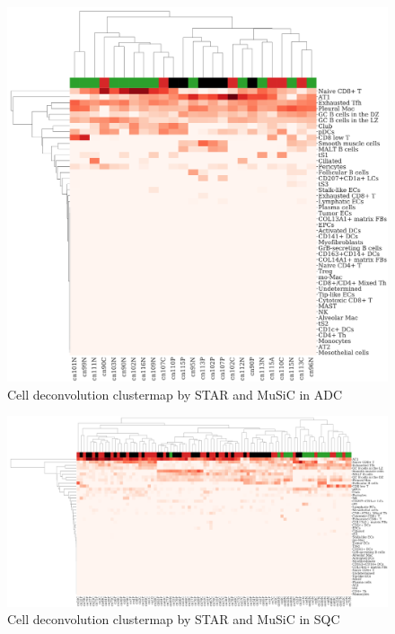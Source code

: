 \documentclass[a4paper]{article}
\begin{document}
                \begin{figure}[htbp]
                    \centering
                    \includegraphics[width=0.6 \linewidth]{figures/MuSiC/clustermap/STAR.ADC.cluster.pdf}
                    \caption{Cell deconvolution clustermap by STAR and MuSiC in ADC}
                    \label{fig:Deconvolution-MuSiC-STAR-cluster-ADC}
                \end{figure}

                \begin{figure}[htbp]
                    \centering
                    \includegraphics[width=\linewidth]{figures/MuSiC/clustermap/STAR.SQC.cluster.pdf}
                    \caption{Cell deconvolution clustermap by STAR and MuSiC in SQC}
                    \label{fig:Deconvolution-MuSiC-STAR-cluster-SQC}
                \end{figure}
\end{document}
